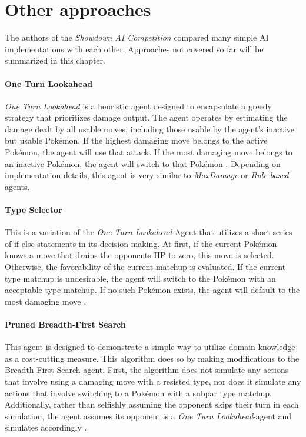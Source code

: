 \section{Other approaches}
The authors of the \textit{Showdown AI Competition}\cite{Lee_Togelius_2017} compared many
simple AI implementations with each other. Approaches not covered so far will be summarized
in this chapter.


\paragraph{One Turn Lookahead}
\emph{One Turn Lookahead} is a heuristic agent designed to encapsulate a greedy strategy that 
prioritizes damage output. The agent operates by estimating the damage dealt by all usable moves, 
including those usable by the agent's inactive but usable Pokémon. If the highest damaging move 
belongs to the active Pokémon, the agent will use that attack. If the most damaging move belongs to 
an inactive Pokémon, the agent will switch to that Pokémon \cite{Lee_Togelius_2017}. Depending 
on implementation details, this agent is very similar to \emph{MaxDamage} or \emph{Rule based}
agents.

\paragraph{Type Selector}
This is a variation of the \textit{One Turn Lookahead}-Agent that utilizes a short series of
if-else statements in its decision-making. At first, if the current Pokémon knows a move 
that drains the opponents \ac{HP} to zero, this move is selected. Otherwise, the 
favorability of the current matchup is evaluated. If the current type matchup is 
undesirable, the agent will switch to the Pokémon with an acceptable type matchup. If no
such Pokémon exists, the agent will default to the most damaging move 
\cite{Lee_Togelius_2017}.

\paragraph{Pruned Breadth-First Search}
This agent is designed to demonstrate a simple way to utilize domain knowledge as a cost-cutting 
measure. This algorithm does so by making modifications to the Breadth First Search agent. First, 
the algorithm does not simulate any actions that involve using a damaging move with a resisted type, 
nor does it simulate any actions that involve switching to a Pokémon with a subpar type matchup. 
Additionally, rather than selfishly assuming the opponent skips their turn in each simulation, the 
agent assumes its opponent is a \emph{One Turn Lookahead}-agent and simulates accordingly \cite{Lee_Togelius_2017}.


